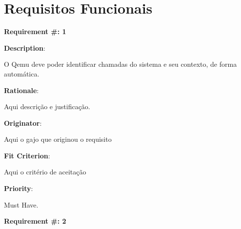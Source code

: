 \pagebreak
\section{Requisitos Funcionais}



\begin{minipage}{0.55\textwidth}
\begin{flushleft}\textbf{Requirement \#: 1}\end{flushleft}
\end{minipage}
\begin{minipage}{0.4\textwidth}
\end{minipage}

\begin{description}
\item \textbf{Description}:

O Qemu deve poder identificar chamadas do sistema e seu contexto, de forma automática. \\

\item \textbf{Rationale}:

Aqui descrição e justificação. \\
\item \textbf{Originator}:

Aqui o gajo que originou o requisito\\

\item \textbf{Fit Criterion}:

Aqui o critério de aceitação \\

\item \textbf{Priority}:

Must Have. \\

\end{description}

\pagebreak













\begin{minipage}{0.55\textwidth}
\begin{flushleft}\textbf{Requirement \#: 2}\end{flushleft}
\end{minipage}
\begin{minipage}{0.4\textwidth}
\end{minipage}

